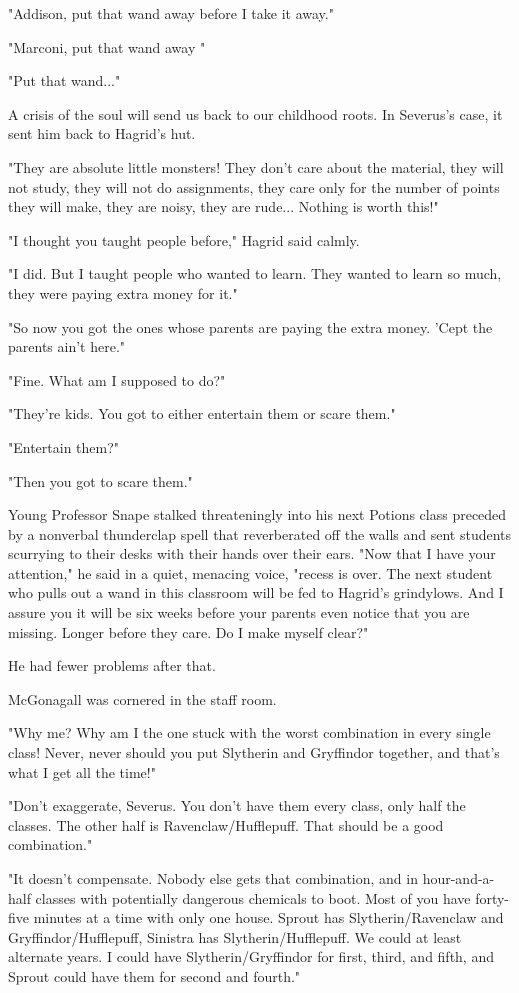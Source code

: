 \documentclass[a4paper,11pt]{article}
\begin{document}
"Addison, put that wand away before I take it away."

"Marconi, put that wand away "

"Put that wand..."

A crisis of the soul will send us back to our childhood roots. In Severus's case, it sent him back to Hagrid's hut.

"They are absolute little monsters! They don't care about the material, they will not study, they will not do assignments, they care only for the number of points they will make, they are noisy, they are rude... Nothing is worth this!"

"I thought you taught people before," Hagrid said calmly.

"I did. But I taught people who wanted to learn. They wanted to learn so much, they were paying extra money for it."

"So now you got the ones whose parents are paying the extra money. 'Cept the parents ain't here."

"Fine. What am I supposed to do?"

"They're kids. You got to either entertain them or scare them."

"Entertain them?"

"Then you got to scare them."

Young Professor Snape stalked threateningly into his next Potions class preceded by a nonverbal thunderclap spell that reverberated off the walls and sent students scurrying to their desks with their hands over their ears. "Now that I have your attention," he said in a quiet, menacing voice, "recess is over. The next student who pulls out a wand in this classroom will be fed to Hagrid's grindylows. And I assure you it will be six weeks before your parents even notice that you are missing. Longer before they care. Do I make myself clear?"

He had fewer problems after that.

McGonagall was cornered in the staff room.

"Why me? Why am I the one stuck with the worst combination in every single class! Never, never should you put Slytherin and Gryffindor together, and that's what I get all the time!"

"Don't exaggerate, Severus. You don't have them every class, only half the classes. The other half is Ravenclaw/Hufflepuff. That should be a good combination."

"It doesn't compensate. Nobody else gets that combination, and in hour-and-a-half classes with potentially dangerous chemicals to boot. Most of you have forty-five minutes at a time with only one house. Sprout has Slytherin/Ravenclaw and Gryffindor/Hufflepuff, Sinistra has Slytherin/Hufflepuff. We could at least alternate years. I could have Slytherin/Gryffindor for first, third, and fifth, and Sprout could have them for second and fourth."
\end{document}
